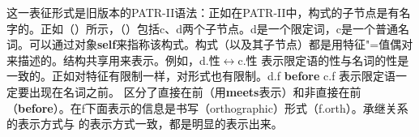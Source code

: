 \noindent
这一表征形式是旧版本的PATR-II语法\citep*{SURT83a}：正如在PATR-II中，构式的子节点是有名字的。正如（）所示，（）包括c、d两个子节点。d是一个限定词，c是一个普通名词。可以通过对象\textbf{self}来指称该构式。构式（以及其子节点）都是用特征"=值偶对来描述的。结构共享用来表示。例如，d.性$\leftrightarrow$c.性 表示限定语的性与名词的性是一致的。正如对特征有限制一样，对形式也有限制。d.f \textbf{before} c.f 表示限定语一定要出现在名词之前。 \citet{BC2005a} 区分了直接在前（用\textbf{meets}表示）和非直接在前（\textbf{before}）。在f下面表示的信息是书写（orthographic）形式（f.orth）。承继关系的表示方式与  \citet{KF99a}的表示方式一致，都是明显的表示出来。

